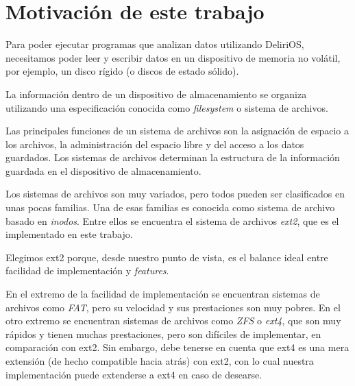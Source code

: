 \section*{Motivación de este trabajo}

Para poder ejecutar programas que analizan datos utilizando DeliriOS, necesitamos poder leer y escribir datos en un dispositivo de memoria no volátil, por ejemplo, un disco rígido (o discos de estado sólido).

La información dentro de un dispositivo de almacenamiento se organiza utilizando una especificación conocida como \emph{filesystem} o sistema de archivos. 

Las principales funciones de un sistema de archivos son la asignación de espacio a los archivos, la administración del espacio libre y del acceso a los datos guardados.
Los sistemas de archivos determinan la estructura de la información guardada en el dispositivo de almacenamiento.

Los sistemas de archivos son muy variados, pero todos pueden ser clasificados en unas pocas familias.
Una de esas familias es conocida como sistema de archivo basado en \emph{inodos}. Entre ellos se encuentra el sistema de archivos \emph{ext2}, que es el implementado en este trabajo.

Elegimos ext2 porque, desde nuestro punto de vista, es el balance ideal entre facilidad de implementación y \emph{features}.

En el extremo de la facilidad de implementación se encuentran sistemas de archivos como \emph{FAT}, pero su velocidad y sus prestaciones son muy pobres.
En el otro extremo se encuentran sistemas de archivos como \emph{ZFS} o \emph{ext4}, que son muy rápidos y tienen muchas prestaciones, pero son difíciles de implementar, en comparación con ext2.
Sin embargo, debe tenerse en cuenta que ext4 es una mera extensión (de hecho compatible hacia atrás) con ext2, con lo cual nuestra implementación puede extenderse a ext4 en caso de desearse.


